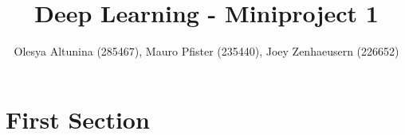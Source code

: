 \documentclass[10pt,conference,compsocconf]{IEEEtran}
\begin{document}
\title{Deep Learning - Miniproject 1}

\author{
  Olesya Altunina (285467), Mauro Pfister (235440), Joey Zenhaeusern (226652)
}

\maketitle

\begin{abstract}

\end{abstract}

\section{First Section}



\end{document}
